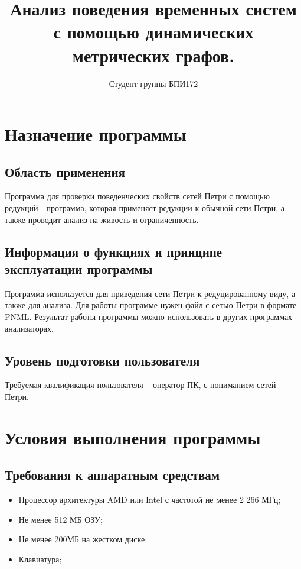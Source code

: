 \documentclass{../TechDoc}
\title{Анализ поведения временных систем с помощью динамических метрических графов.}
\author{Студент группы БПИ172}{А. А. Измайлов}
\begin{document}
	\maketitle
	\tableofcontents
	
	\section{Назначение программы}
	\subsection{Область применения}
	Программа для проверки поведенческих свойств сетей Петри с помощью редукций - программа, которая применяет редукции к обычной сети Петри, а также проводит анализ на живость и ограниченность.
	
	\subsection{Информация о функциях и принципе эксплуатации программы}
	Программа используется для приведения сети Петри к редуцированному виду, а также для анализа. Для работы программе нужен файл с сетью Петри в формате PNML. Результат работы программы можно использовать в других программах-анализаторах.
	
	\subsection{Уровень подготовки пользователя}
	Требуемая квалификация пользователя – оператор ПК, с пониманием сетей Петри.
	
	\section{Условия выполнения программы}
	\subsection{Требования к аппаратным средствам}
	\begin{itemize}
		\item Процессор архитектуры AMD или Intel с частотой не менее 2 266 МГц;
		\item Не менее 512 МБ ОЗУ;
		\item Не менее 200МБ на жестком диске;
		\item Клавиатура;
	\end{itemize}
	
\end{document}
